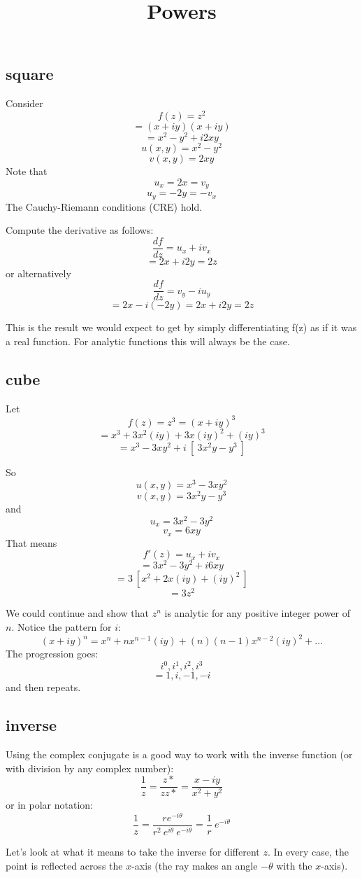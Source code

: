 \documentclass[11pt, oneside]{article}
\title{Powers}
\date{}
\begin{document}
\maketitle
\Large


\subsection*{square}
Consider 
\[ f(z) = z^2 \]
\[ = (x + iy)(x + iy) \]
\[ = x^2 - y^2 + i2xy \]
\[ u(x,y) = x^2 - y^2 \]
\[ v(x,y) = 2xy \]
Note that
\[ u_x = 2x = v_y \]
\[ u_y = -2y = - v_x \]
The Cauchy-Riemann conditions (CRE) hold.

Compute the derivative as follows:
\[ \frac{df}{dz} = u_x + i v_x \]
\[ = 2x + i 2y = 2z \]
or alternatively
\[ \frac{df}{dz} = v_y - i u_y \]
\[ = 2x - i (-2y) = 2x + i2y = 2z \]

This is the result we would expect to get by simply differentiating f(z) as if it was a real function. For analytic functions this will always be the case.

\subsection*{cube}
Let
\[ f(z) = z^3 = (x + iy)^3 \]
\[ = x^3 + 3x^2(iy) + 3x(iy)^2 + (iy)^3 \]
\[ = x^3 - 3xy^2 + i \ [ \ 3x^2y - y^3 \ ] \]

So
\[ u(x,y) = x^3 - 3xy^2 \]
\[ v(x,y) = 3x^2y - y^3 \]
and
\[ u_x = 3x^2 - 3y^2 \]
\[ v_x = 6xy \]
That means
\[ f'(z) = u_x + i v_x \]
\[ = 3x^2 - 3y^2 + i 6xy \]
\[ = 3 \ [ x^2 + 2x(iy) + (iy)^2 \ ] \]
\[ = 3z^2 \]

We could continue and show that $z^n$ is analytic for any positive integer power of $n$.
Notice the pattern for $i$:
\[ (x + iy)^n = x^n + nx^{n-1}(iy) + (n)(n-1)x^{n-2}(iy)^2 + \dots \]
The progression goes:
\[ i^0, i^1, i^2, i^3 \]
\[ = 1, i, -1, -i \]
and then repeats.

\subsection*{inverse}
Using the complex conjugate is a good way to work with the inverse function (or with division by any complex number):
\[ \frac{1}{z} = \frac{z*}{zz*} = \frac{x - iy}{x^2 + y^2} \]
or in polar notation:
\[  \frac{1}{z} =  \frac{r e^{-i \theta}}{r^2 \ e^{i \theta} \ e^{-i \theta}} = \frac{1}{r} \ e^{-i \theta} \]

Let's look at what it means to take the inverse for different $z$.  In every case, the point is reflected across the $x$-axis (the ray makes an angle $- \theta$ with the $x$-axis).  
\end{document}
